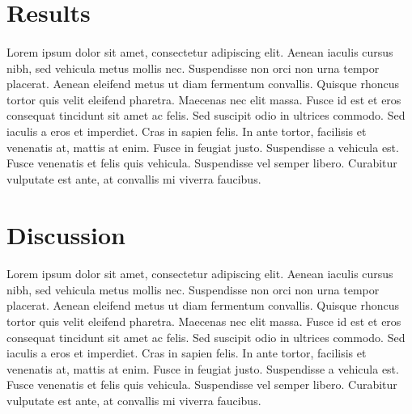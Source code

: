 \documentclass[11pt]{bioinlab}
\begin{document}
\section{Results}
\paragraph{}Lorem ipsum dolor sit amet, consectetur adipiscing elit. Aenean iaculis cursus nibh, sed vehicula metus mollis nec. Suspendisse non orci non urna tempor placerat. Aenean eleifend metus ut diam fermentum convallis. Quisque rhoncus tortor quis velit eleifend pharetra. Maecenas nec elit massa. Fusce id est et eros consequat tincidunt sit amet ac felis. Sed suscipit odio in ultrices commodo. Sed iaculis a eros et imperdiet. Cras in sapien felis. In ante tortor, facilisis et venenatis at, mattis at enim. Fusce in feugiat justo. Suspendisse a vehicula est. Fusce venenatis et felis quis vehicula. Suspendisse vel semper libero. Curabitur vulputate est ante, at convallis mi viverra faucibus. 
\newpage
\section{Discussion}
\paragraph{}Lorem ipsum dolor sit amet, consectetur adipiscing elit. Aenean iaculis cursus nibh, sed vehicula metus mollis nec. Suspendisse non orci non urna tempor placerat. Aenean eleifend metus ut diam fermentum convallis. Quisque rhoncus tortor quis velit eleifend pharetra. Maecenas nec elit massa. Fusce id est et eros consequat tincidunt sit amet ac felis. Sed suscipit odio in ultrices commodo. Sed iaculis a eros et imperdiet. Cras in sapien felis. In ante tortor, facilisis et venenatis at, mattis at enim. Fusce in feugiat justo. Suspendisse a vehicula est. Fusce venenatis et felis quis vehicula. Suspendisse vel semper libero. Curabitur vulputate est ante, at convallis mi viverra faucibus.
\end{document}
